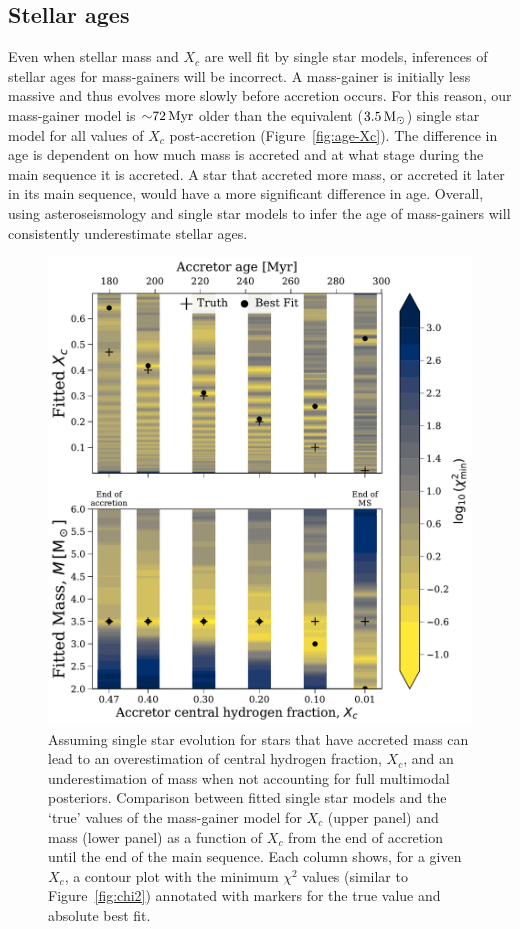 \documentclass[desactivate]{aa}
\begin{document}
\subsection{Stellar ages}

Even when stellar mass and $X_c$ are well fit by single star models, inferences of stellar ages for mass-gainers will be incorrect. A mass-gainer is initially less massive and thus evolves more slowly before accretion occurs. For this reason, our mass-gainer model is ${\sim}72 \, {\rm Myr}$ older than the equivalent ($3.5 \, {\rm M_\odot}$) single star model for all values of $X_c$ post-accretion (Figure~\ref{fig:age-Xc}). The difference in age is dependent on how much mass is accreted and at what stage during the main sequence it is accreted. A star that accreted more mass, or accreted it later in its main sequence, would have a more significant difference in age. Overall, using asteroseismology and single star models to infer the age of mass-gainers will consistently underestimate stellar ages.

\begin{figure}
    \centering
    \includegraphics[width=\columnwidth]{paper/figures/relative_estimates_psp.pdf}
    \caption{Assuming single star evolution for stars that have accreted mass can lead to an overestimation of central hydrogen fraction, $X_c$, and an underestimation of mass when not accounting for full multimodal posteriors. Comparison between fitted single star models and the `true' values of the mass-gainer model for $X_c$ (upper panel) and mass (lower panel) as a function of $X_c$ from the end of accretion until the end of the main sequence. Each column shows, for a given $X_c$, a contour plot with the minimum $\chi^2$ values (similar to Figure~\ref{fig:chi2}) annotated with markers for the true value and absolute best fit.}
    \label{fig:relative_estimates_psp}
\end{figure}
\end{document}
